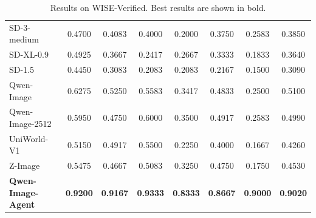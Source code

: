 \begin{table}[t]
{\begin{tabular}{l|cccccc|c}
SD-3-medium~\citep{sd3Medium} & 0.4700 & 0.4083 & 0.4000 & 0.2000 & 0.3750 & 0.2583 & 0.3850 \\
SD-XL-0.9~\citep{podell2023sdxl} & 0.4925 & 0.3667 & 0.2417 & 0.2667 & 0.3333 & 0.1833 & 0.3640 \\
SD-1.5~\citep{rombach2022high} & 0.4450 & 0.3083 & 0.2083 & 0.2083 & 0.2167 & 0.1500 & 0.3090 \\
Qwen-Image~\citep{wu2025qwen} & 0.6275 & 0.5250 & 0.5583 & 0.3417 & 0.4833 & 0.2500 & 0.5100 \\
Qwen-Image-2512~\citep{wu2025qwen} & 0.5950 & 0.4750 & 0.6000 & 0.3500 & 0.4917 & 0.2583 & 0.4990 \\
UniWorld-V1~\citep{lin2025uniworld} & 0.5150 & 0.4917 & 0.5500 & 0.2250 & 0.4000 & 0.1667 & 0.4260 \\
Z-Image~\citep{cai2025z} & 0.5475 & 0.4667 & 0.5083 & 0.3250 & 0.4750 & 0.1750 & 0.4530 \\
\rowcolor{blue!10}
\textbf{Qwen-Image-Agent} & \textbf{0.9200} & \textbf{0.9167} & \textbf{0.9333} & \textbf{0.8333} & \textbf{0.8667} & \textbf{0.9000} & \textbf{0.9020} \\
\bottomrule
\end{tabular}
}
\caption{Results on WISE-Verified. Best results are shown in bold.}
\label{tab:wise}
\end{table}